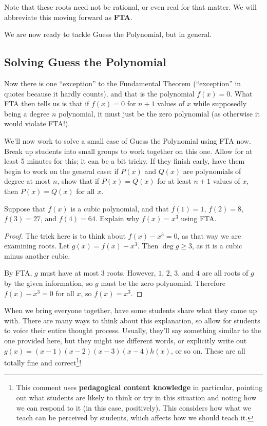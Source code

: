 Note that these roots need not be rational, or even real for that matter. We will abbreviate this moving forward as \textbf{FTA}.

We are now ready to tackle Guess the Polynomial, but in general.

\subsection{Solving Guess the Polynomial}

Now there is one ``exception'' to the Fundamental Theorem (``exception'' in quotes because it hardly counts), and that is the polynomial $f(x) = 0$. What FTA then tells us is that if $f(x) = 0$ for $n+1$ values of $x$ while supposedly being a degree $n$ polynomial, it must just be the zero polynomial (as otherwise it would violate FTA!).

We'll now work to solve a small case of Guess the Polynomial using FTA now. Break up students into small groups to work together on this one. Allow for at least 5 minutes for this; it can be a bit tricky. If they finish early, have them begin to work on the general case: if $P(x)$ and $Q(x)$ are polynomials of degree at most $n$, show that if $P(x) = Q(x)$ for at least $n+1$ values of $x$, then $P(x) = Q(x)$ for all $x$.
\begin{example}
    Suppose that $f(x)$ is a cubic polynomial, and that $f(1) = 1$, $f(2) = 8$, $f(3) = 27$, and $f(4) = 64$. Explain why $f(x) = x^3$ using FTA.
\end{example}
\begin{proof}
    The trick here is to think about $f(x) - x^3 = 0$, as that way we are examining roots. Let $g(x) = f(x) - x^3$. Then $\deg g \ge 3$, as it is a cubic minus another cubic.

    By FTA, $g$ must have at most $3$ roots. However, $1$, $2$, $3$, and $4$ are all roots of $g$ by the given information, so $g$ must be the zero polynomial. Therefore $f(x) - x^3 = 0$ for all $x$, so $f(x) = x^3$.
\end{proof}

When we bring everyone together, have some students share what they came up with. There are many ways to think about this explanation, so allow for students to voice their entire thought process. Usually, they'll say something similar to the one provided here, but they might use different words, or explicitly write out $g(x) = (x-1)(x-2)(x-3)(x-4)h(x)$, or so on. These are all totally fine and correct\footnote{This comment uses \textbf{pedagogical content knowledge} in particular, pointing out what students are likely to think or try in this situation and noting how we can respond to it (in this case, positively). This considers how what we teach can be perceived by students, which affects how we should teach it.}!

